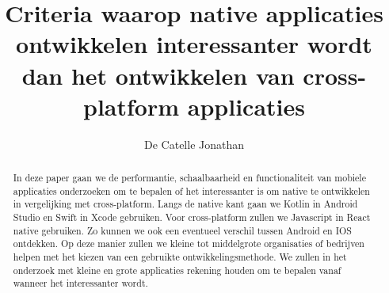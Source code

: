 \documentclass{hogent-article}
\title{Criteria waarop native applicaties ontwikkelen interessanter wordt dan het ontwikkelen van cross-platform applicaties}
\author{De Catelle Jonathan}
\begin{document}
\begin{abstract}
  In deze paper gaan we de performantie, schaalbaarheid en functionaliteit van mobiele applicaties 
  onderzoeken om te bepalen of het interessanter is om native te ontwikkelen in vergelijking met 
  cross-platform. Langs de native kant gaan we Kotlin in Android Studio en Swift in Xcode gebruiken. 
  Voor cross-platform zullen we Javascript in React native gebruiken. Zo kunnen we ook een eventueel 
  verschil tussen Android en IOS ontdekken. Op deze manier zullen we kleine tot middelgrote 
  organisaties of bedrijven helpen met het kiezen van een gebruikte ontwikkelingsmethode. 
  We zullen in het onderzoek met kleine en grote applicaties rekening houden om te bepalen 
  vanaf wanneer het interessanter wordt.
\end{abstract}

\tableofcontents



\printbibliography[heading=bibintoc]
\end{document}
